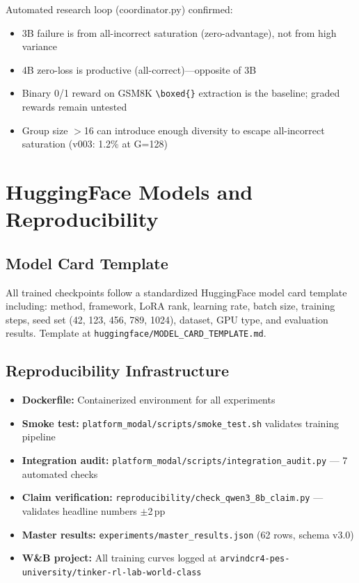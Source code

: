 \documentclass[12pt,a4paper]{report}
\theoremstyle{definition}
\begin{document}
Automated research loop (coordinator.py) confirmed:
\begin{itemize}[nosep]
\item 3B failure is from all-incorrect saturation (zero-advantage), not from high variance
\item 4B zero-loss is productive (all-correct)---opposite of 3B
\item Binary 0/1 reward on GSM8K \texttt{\textbackslash boxed\{\}} extraction is the baseline; graded rewards remain untested
\item Group size $>$16 can introduce enough diversity to escape all-incorrect saturation (v003: 1.2\% at G=128)
\end{itemize}




\chapter{HuggingFace Models and Reproducibility}
\label{ch:hf-repro}

\section{Model Card Template}
\label{sec:model-card}

All trained checkpoints follow a standardized HuggingFace model card template including:
method, framework, LoRA rank, learning rate, batch size, training steps, seed set (42, 123, 456, 789, 1024),
dataset, GPU type, and evaluation results. Template at \texttt{huggingface/MODEL\_CARD\_TEMPLATE.md}.

\section{Reproducibility Infrastructure}
\label{sec:repro-infra}

\begin{itemize}[nosep]
\item \textbf{Dockerfile:} Containerized environment for all experiments
\item \textbf{Smoke test:} \texttt{platform\_modal/scripts/smoke\_test.sh} validates training pipeline
\item \textbf{Integration audit:} \texttt{platform\_modal/scripts/integration\_audit.py} --- 7 automated checks
\item \textbf{Claim verification:} \texttt{reproducibility/check\_qwen3\_8b\_claim.py} --- validates headline numbers $\pm$2\,pp
\item \textbf{Master results:} \texttt{experiments/master\_results.json} (62 rows, schema v3.0)
\item \textbf{W\&B project:} All training curves logged at \texttt{arvindcr4-pes-university/tinker-rl-lab-world-class}
\end{itemize}
\end{document}
